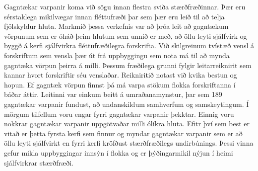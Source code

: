 Gagntækar varpanir koma við sögu innan flestra sviða stærðfræðinnar. Þær eru sérstaklega mikilvægar innan fléttufræði þar sem þær eru leið til að telja fjölskyldur hluta. Markmið þessa verkefnis var að þróa leit að gagntækum vörpunum sem er óháð þeim hlutum sem unnið er með, að öllu leyti sjálfvirk og byggð á kerfi sjálfvirkra fléttufræðilegra forskrifta. Við skilgreinum tvístæð vensl á forskriftum sem vensla þær út frá uppbyggingu sem nota má til að mynda gagntæka vörpun þeirra á milli. Þessum fræðilega grunni fylgir leitarreiknirit sem kannar hvort forskriftir séu venslaðar. Reikniritið notast við kvika bestun og hopun. Ef gagntæk vörpun finnst þá má varpa stökum flokka forskriftanna í báðar áttir. Leitinni var einkum beitt á umraðanamynstur, þar sem 189 gagntækar varpanir fundust, að undanskildum samhverfum og samskeytingum. Í mörgum tilfellum voru engar fyrri gagntækar varpanir þekktar. Einnig voru nokkrar gagntækar varpanir uppgötvaðar milli ólíkra hluta. Efitr því sem best er vitað er þetta fyrsta kerfi sem finnur og myndar gagntækar varpanir sem er að öllu leyti sjálfvirkt en fyrri kerfi kröfðust stærðfræðilegs undirbúnings. Þessi vinna gefur mikla uppbyggingar innsýn í flokka og er þýðingarmikil nýjun í heimi sjálfvirkrar stærðfræði.
